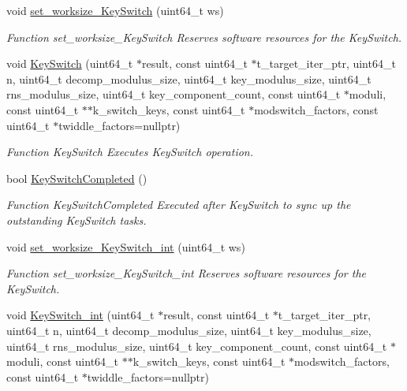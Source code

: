\begin{DoxyCompactItemize}
void \hyperlink{namespaceintel_1_1hexl_1_1fpga_aa44b63d1963a3365430ad47c609579cd}{set\-\_\-worksize\-\_\-\-Key\-Switch} (uint64\-\_\-t ws)
\begin{DoxyCompactList}\small\item\em Function set\-\_\-worksize\-\_\-\-Key\-Switch Reserves software resources for the Key\-Switch. \end{DoxyCompactList}\item 
void \hyperlink{namespaceintel_1_1hexl_1_1fpga_a98d007085580209bcfa2ab40bc8c0322}{Key\-Switch} (uint64\-\_\-t $\ast$result, const uint64\-\_\-t $\ast$t\-\_\-target\-\_\-iter\-\_\-ptr, uint64\-\_\-t n, uint64\-\_\-t decomp\-\_\-modulus\-\_\-size, uint64\-\_\-t key\-\_\-modulus\-\_\-size, uint64\-\_\-t rns\-\_\-modulus\-\_\-size, uint64\-\_\-t key\-\_\-component\-\_\-count, const uint64\-\_\-t $\ast$moduli, const uint64\-\_\-t $\ast$$\ast$k\-\_\-switch\-\_\-keys, const uint64\-\_\-t $\ast$modswitch\-\_\-factors, const uint64\-\_\-t $\ast$twiddle\-\_\-factors=nullptr)
\begin{DoxyCompactList}\small\item\em Function Key\-Switch Executes Key\-Switch operation. \end{DoxyCompactList}\item 
bool \hyperlink{namespaceintel_1_1hexl_1_1fpga_a59d10b11c2bb32dabdaa5cace87cfe29}{Key\-Switch\-Completed} ()
\begin{DoxyCompactList}\small\item\em Function Key\-Switch\-Completed Executed after Key\-Switch to sync up the outstanding Key\-Switch tasks. \end{DoxyCompactList}\item 
void \hyperlink{namespaceintel_1_1hexl_1_1fpga_a79bc7f64c45a9739195b344fa0da4b62}{set\-\_\-worksize\-\_\-\-Key\-Switch\-\_\-int} (uint64\-\_\-t ws)
\begin{DoxyCompactList}\small\item\em Function set\-\_\-worksize\-\_\-\-Key\-Switch\-\_\-int Reserves software resources for the Key\-Switch. \end{DoxyCompactList}\item 
void \hyperlink{namespaceintel_1_1hexl_1_1fpga_a0156eca4c63183b90eeab8023329326d}{Key\-Switch\-\_\-int} (uint64\-\_\-t $\ast$result, const uint64\-\_\-t $\ast$t\-\_\-target\-\_\-iter\-\_\-ptr, uint64\-\_\-t n, uint64\-\_\-t decomp\-\_\-modulus\-\_\-size, uint64\-\_\-t key\-\_\-modulus\-\_\-size, uint64\-\_\-t rns\-\_\-modulus\-\_\-size, uint64\-\_\-t key\-\_\-component\-\_\-count, const uint64\-\_\-t $\ast$moduli, const uint64\-\_\-t $\ast$$\ast$k\-\_\-switch\-\_\-keys, const uint64\-\_\-t $\ast$modswitch\-\_\-factors, const uint64\-\_\-t $\ast$twiddle\-\_\-factors=nullptr)

\end{DoxyCompactItemize}
